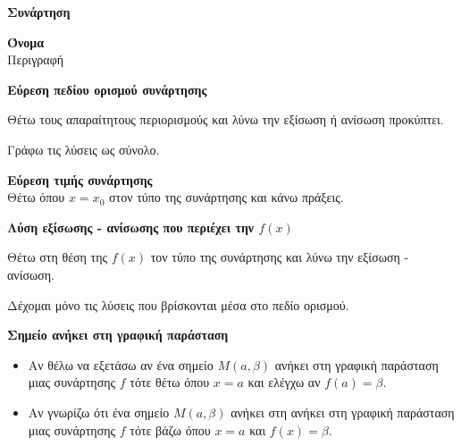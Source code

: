 \documentclass[twoside,nofonts,internet,math,spyros]{frontisthrio}
\begin{document}
\newpage
\orismoi
\begin{arithmisi}
\item\textbf{Συνάρτηση}\\

\end{arithmisi}
\thewrhmata
\begin{arithmisi}
\item\textbf{Όνομα}\\
Περιγραφή
\end{arithmisi}
\methodologia
\begin{arithmisi}
\item\textbf{Εύρεση πεδίου ορισμού συνάρτησης}
\begin{bhma}
\item Θέτω τους απαραίτητους περιορισμούς και λύνω την εξίσωση ή ανίσωση προκύπτει.
\item Γράφω τις λύσεις ως σύνολο.
\end{bhma}
\item\textbf{Εύρεση τιμής συνάρτησης}\\
Θέτω όπου $x=x_0$ στον τύπο της συνάρτησης και κάνω πράξεις.
\item\textbf{Λύση εξίσωσης - ανίσωσης που περιέχει την $f(x)$}
\begin{bhma}
\item Θέτω στη θέση της $f(x)$ τον τύπο της συνάρτησης και λύνω την εξίσωση - ανίσωση.
\item Δέχομαι μόνο τις λύσεις που βρίσκονται μέσα στο πεδίο ορισμού.
\end{bhma}
\item\textbf{Σημείο ανήκει στη γραφική παράσταση}
\begin{itemize}[leftmargin=4mm]
 \item Αν θέλω να εξετάσω αν ένα σημείο $M(a,\beta)$ ανήκει στη γραφική παράσταση μιας συνάρτησης $f$ τότε θέτω όπου $x=a$ και ελέγχω αν $f(a)=\beta$.
 \item Αν γνωρίζω ότι ένα σημείο $M(a,\beta)$ ανήκει στη ανήκει στη γραφική παράσταση μιας συνάρτησης $f$ τότε βάζω όπου $x=a$ και $f(x)=\beta$.
\end{itemize}
\end{arithmisi}
\end{document}

